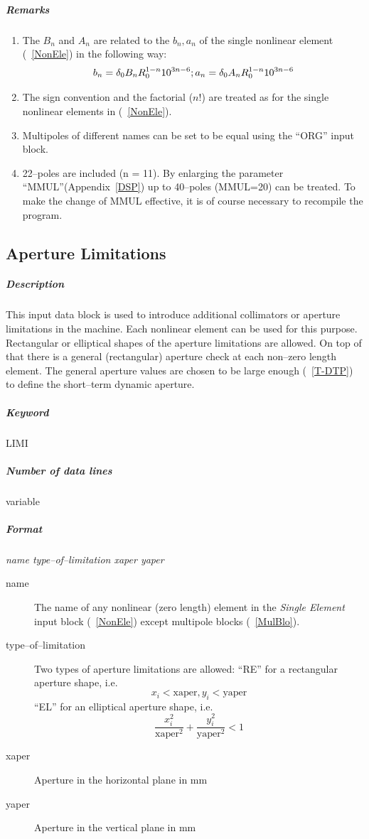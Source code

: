 \documentclass[a4paper,11pt]{report}
\begin{document}
\subparagraph{Remarks}
\begin{enumerate}
\item The $ B_{n} $ and $ A_{n} $ are related to the $ b_{n}, a_{n} $
  of the single nonlinear element (~\ref{NonEle}) in the following
  way:
  $$
  b_{n} = \delta_{0} B_{n} R_{0}^{1-n} 10^{3n-6}; \\
  a_{n} = \delta_{0} A_{n} R_{0}^{1-n} 10^{3n-6}
  $$
\item The sign convention and the factorial ($n$!) are treated as for
  the single nonlinear elements in (~\ref{NonEle}).
\item Multipoles of different names can be set to be equal using the
  ``ORG'' input block.
\item 22--poles are included (n = 11). By enlarging the parameter
  ``MMUL''(Appendix~\ref{DSP}) up to 40--poles (MMUL=20) can be
  treated. To make the change of MMUL effective, it is of course
  necessary to recompile the program.
\end{enumerate}

\subsection{Aperture Limitations} \label{ApeLim}

\subparagraph{Description} This input data block is used to introduce
additional collimators or aperture limitations in the machine.  Each
nonlinear element can be used for this purpose. Rectangular or
elliptical shapes of the aperture limitations are allowed. On top of
that there is a general (rectangular) aperture check at each non--zero
length element. The general aperture values are chosen to be large
enough (~\ref{T-DTP}) to define the short--term dynamic aperture.

\subparagraph{Keyword} LIMI \subparagraph{Number of data lines}
variable

\subparagraph{Format} {\em name type--of--limitation xaper yaper}

\begin{description}
\item [name] The name of any nonlinear (zero length) element in the
  {\em Single Element} \/input block (~\ref{NonEle}) except multipole
  blocks (~\ref{MulBlo}).
\item [type--of--limitation] Two types of aperture limitations are
  allowed: \newline ``RE'' for a rectangular aperture shape, i.e.\ 
  $$
  x_{i} < \mathrm{xaper}, y_{i} < \mathrm{yaper}
  $$
  ``EL'' for an elliptical aperture shape, i.e.\ 
  $$
  \frac{x_{i}^{2}}{\mathrm{xaper}^{2}} + \frac{y_{i}^{2}}
  {\mathrm{yaper}^{2}} < 1
  $$
\item [xaper] Aperture in the horizontal plane in mm
\item [yaper] Aperture in the vertical plane in mm
\end{description}
\end{document}
